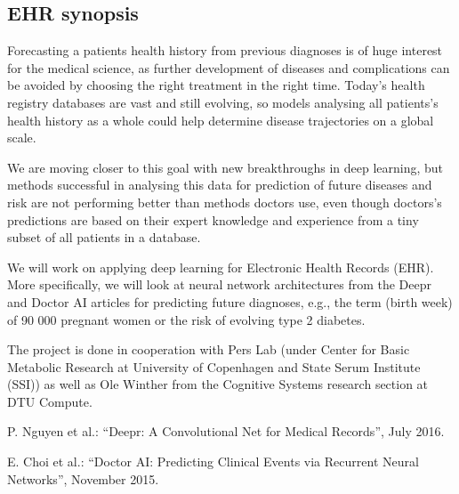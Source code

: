 \subsection*{EHR synopsis}

Forecasting a patients health history from previous diagnoses is of huge interest for the medical science, as further development of diseases and complications can be avoided by choosing the right treatment in the right time. Today’s health registry databases are vast and still evolving, so models analysing all patients’s health history as a whole could help determine disease trajectories on a global scale.

We are moving closer to this goal with new breakthroughs in deep learning, but methods successful in analysing this data for prediction of future diseases and risk are not performing better than methods doctors use, even though doctors’s predictions are based on their expert knowledge and experience from a tiny subset of all patients in a database.

We will work on applying deep learning for Electronic Health Records (EHR). More specifically, we will look at neural network architectures from the Deepr and Doctor AI articles for predicting future diagnoses, e.g., the term (birth week) of 90 000 pregnant women or the risk of evolving type 2 diabetes.

The project is done in cooperation with Pers Lab (under Center for Basic Metabolic Research at University of Copenhagen and State Serum Institute (SSI)) as well as Ole Winther from the Cognitive Systems research section at DTU Compute.

P. Nguyen et al.: “Deepr: A Convolutional Net for Medical Records”, July 2016.

E. Choi et al.: “Doctor AI: Predicting Clinical Events via Recurrent Neural Networks”, November 2015.
